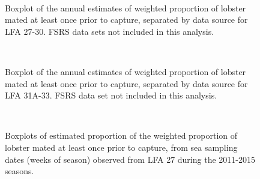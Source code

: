 \documentclass[11pt]{article}
\newcommand{\e}{/backup/bio_data/bio.lobster/figures/} %
\begin{document}
\begin{figure}
        \centering
         \\
                     \caption{Boxplot of the annual estimates of weighted proportion of lobster mated at least once prior to capture, separated by data source for LFA 27-30. FSRS data sets not included in this analysis.}
        \end{figure}

\begin{figure}
        \centering
         \\
                    \caption{Boxplot of the annual estimates of weighted proportion of lobster mated at least once prior to capture, separated by data source for LFA 31A-33. FSRS data set not included in this analysis.}
        \end{figure}

\begin{figure}
        \centering
         \\
                     \caption{Boxplots of estimated proportion of the weighted proportion of lobster mated at least once prior to capture, from sea sampling dates (weeks of season) observed from LFA 27 during the 2011-2015 seasons. }
        \end{figure}

%
%
\end{document}
